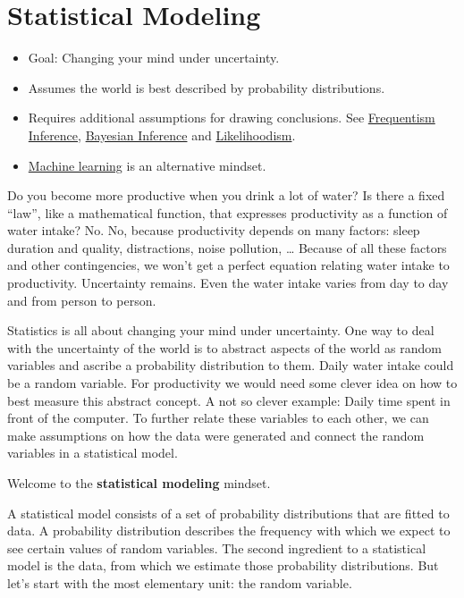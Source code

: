 \documentclass[
  10pt,
]{scrbook}
\providecommand{\tightlist}{%
  \setlength{\itemsep}{0pt}\setlength{\parskip}{0pt}}
\begin{document}
\hypertarget{statistical-modeling}{%
\chapter{Statistical Modeling}\label{statistical-modeling}}

\begin{itemize}
\tightlist
\item
  Goal: Changing your mind under uncertainty.
\item
  Assumes the world is best described by probability distributions.
\item
  Requires additional assumptions for drawing conclusions. See \protect\hyperlink{frequentist-inference}{Frequentism Inference}, \protect\hyperlink{bayesian-inference}{Bayesian Inference} and \protect\hyperlink{likelihoodism}{Likelihoodism}.
\item
  \protect\hyperlink{machine-learning}{Machine learning} is an alternative mindset.
\end{itemize}

Do you become more productive when you drink a lot of water?
Is there a fixed ``law'', like a mathematical function, that expresses productivity as a function of water intake?
No.
No, because productivity depends on many factors: sleep duration and quality, distractions, noise pollution, \ldots{}
Because of all these factors and other contingencies, we won't get a perfect equation relating water intake to productivity.
Uncertainty remains.
Even the water intake varies from day to day and from person to person.

Statistics is all about changing your mind under uncertainty.
One way to deal with the uncertainty of the world is to abstract aspects of the world as random variables and ascribe a probability distribution to them.
Daily water intake could be a random variable.
For productivity we would need some clever idea on how to best measure this abstract concept.
A not so clever example: Daily time spent in front of the computer.
To further relate these variables to each other, we can make assumptions on how the data were generated and connect the random variables in a statistical model.

Welcome to the \textbf{statistical modeling} mindset.

A statistical model consists of a set of probability distributions that are fitted to data.
A probability distribution describes the frequency with which we expect to see certain values of random variables.
The second ingredient to a statistical model is the data, from which we estimate those probability distributions.
But let's start with the most elementary unit: the random variable.
\end{document}
